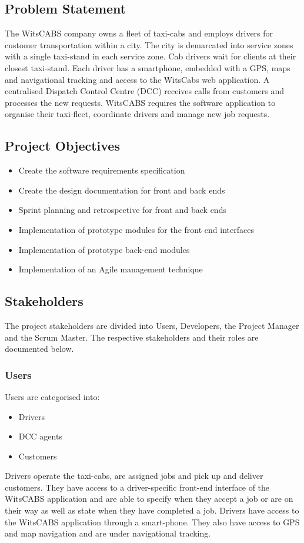 \documentclass[12pt]{article}
\begin{document}
\subsection{Problem Statement}
The WitsCABS company owns a fleet of taxi-cabs and employs drivers for customer transportation within a city. The city is demarcated into service zones with a single taxi-stand in each service zone. Cab drivers wait for clients at their closest taxi-stand. Each driver has a smartphone, embedded with a GPS, maps and navigational tracking and access to the WitsCabs web application. A centralised Dispatch Control Centre (DCC) receives calls from customers and processes the new requests. WitsCABS requires the software application to organise their taxi-fleet, coordinate drivers and manage new job requests.

\subsection{Project Objectives}
\begin{itemize}
\item Create the software requirements specification
\item Create the design documentation for front and back ends
\item Sprint planning  and retrospective for front and back ends
\item Implementation of prototype modules for the front end interfaces
\item Implementation of prototype back-end modules
\item Implementation of an Agile management technique
\end{itemize}

\subsection{Stakeholders}
The project stakeholders are divided into Users, Developers, the Project Manager and the Scrum Master. The respective stakeholders and their roles are documented below.
\subsubsection{Users}
Users are categorised into:
\begin{itemize}
\item Drivers
\item DCC agents
\item Customers
\end{itemize} 
Drivers operate the taxi-cabs, are assigned jobs and pick up and deliver customers. They have access to a driver-specific front-end interface of the WitsCABS application and are able to specify when they accept a job or are on their way as well as state when they have completed a job. Drivers have access to the WitsCABS application through a smart-phone. They also have access to GPS and map navigation and are under navigational tracking. \\\\
\end{document}
